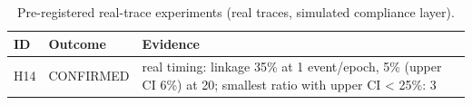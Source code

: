 \begin{table}[t]
\centering\small
\caption{Pre-registered real-trace experiments (real traces, simulated compliance layer).}
\label{tab:real}
\begin{tabular}{llp{9cm}}
\toprule
ID & Outcome & Evidence \\
\midrule
H14 & CONFIRMED & real timing: linkage 35\% at 1 event/epoch, 5\% (upper CI 6\%) at 20; smallest ratio with upper CI < 25\%: 3 \\
\bottomrule
\end{tabular}
\end{table}
